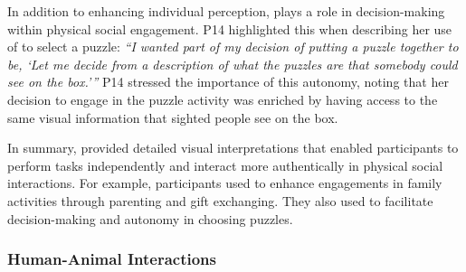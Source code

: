 
In addition to enhancing individual perception, \bma{} plays a role in decision-making within physical social engagement. P14 highlighted this when describing her use of \bma{} to select a puzzle:
\textit{``I wanted part of my decision of putting a puzzle together to be, `Let me decide from a description of what the puzzles are that somebody could see on the box.'''} 
% 
P14 stressed the importance of this autonomy, noting that her decision to engage in the puzzle activity was enriched by having access to the same visual information that sighted people see on the box.





In summary, \bma{} provided detailed visual interpretations that enabled participants to perform tasks independently and interact more authentically in physical social interactions. For example, participants used \bma{} to enhance engagements in family activities through parenting and gift exchanging. They also used \bma{} to facilitate decision-making and autonomy in choosing puzzles. 



\subsubsection{Human-Animal Interactions}
\label{animal}

